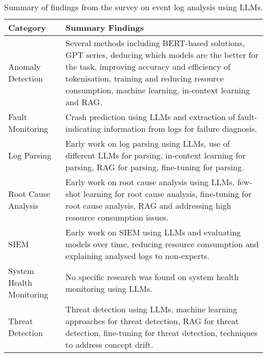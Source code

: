 \begin{table*}[hbt!]
\centering
\begin{tabular}{|l|p{11cm}|}
\hline
\textbf{Category} & \textbf{Summary Findings} \\
\hline
Anomaly Detection & Several methods including BERT-based solutions, GPT series, deducing which models are the better for the task, improving accuracy and efficiency of tokenisation, training and reducing resource consumption, machine learning, in-context learning and RAG. \\ 
\hline
Fault Monitoring & Crash prediction using LLMs and extraction of fault-indicating information from logs for failure diagnosis. \\
\hline
Log Parsing & Early work on log parsing using LLMs, use of different LLMs for parsing, in-context learning for parsing, RAG for parsing, fine-tuning for parsing. \\
\hline
Root Cause Analysis & Early work on root cause analysis using LLMs, few-shot learning for root cause analysis, fine-tuning for root cause analysis, RAG and addressing high resource consumption issues. \\
\hline
SIEM & Early work on SIEM using LLMs and evaluating models over time, reducing resource consumption and explaining analysed logs to non-experts. \\
\hline
System Health Monitoring & No specific research was found on system health monitoring using LLMs. \\
\hline
Threat Detection & Threat detection using LLMs, machine learning approaches for threat detection, RAG for threat detection, fine-tuning for threat detection, techniques to address concept drift. \\
\hline
\end{tabular}
\caption{Summary of findings from the survey on event log analysis using LLMs.}
\label{tab:summ}
\end{table*}



